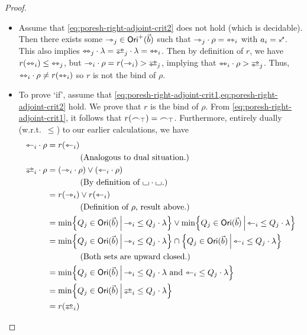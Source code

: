 \documentclass[a4paper]{memoir}
\begin{document}
\begin{proof}
\begin{enumerate}
\begin{itemize}
			\item Assume that \cref{eq:poresh-right-adjoint-crit2} does not hold (which is decidable).
			Then there exists some ${\rightarrowtriangle}_j \in {\mathsf{Ori}}^+(\vec b)$ such that ${\rightarrowtriangle}_j \cdot \rho = {\leftrightarrowtriangle}_i$ with $a_i = \ypolar$.
			This also implies $\equijetsym_j \cdot \lambda = \infrajetsym_j \cdot \lambda = \equijetsym_i$.
			Then by definition of $r$, we have $r({\leftrightarrowtriangle}_i) \leq {\leftrightarrowtriangle}_j$, but $\jetsym_i \cdot \rho = r(\jetsym_i) > \infrajetsym_j$, implying that $\equijetsym_i \cdot \rho > \infrajetsym_j$. Thus, ${\leftrightarrowtriangle}_i \cdot \rho \neq r({\leftrightarrowtriangle}_i)$ so $r$ is not the bind of $\rho$.
			
			\item To prove `if', assume that \cref{eq:poresh-right-adjoint-crit1,eq:poresh-right-adjoint-crit2} hold.
			We prove that $r$ is the bind of $\rho$.
			From \cref{eq:poresh-right-adjoint-crit1}, it follows that $r({\frown}_\top) = {\frown}_\top$.
			Furthermore, entirely dually (w.r.t.\ $\leq$) to our earlier calculations, we have
			\begin{align*}
				\tejsym_i \cdot \rho &= r(\tejsym_i) \\
				&\qquad \qquad \text{(Analogous to dual situation.)} \\
				\infrajetsym_i \cdot \rho
				&= (\jetsym_i \cdot \rho) \vee (\tejsym_i \cdot \rho) \\
				&\qquad \qquad \text{(By definition of $\loch \cdot \loch$.)} \\
				&= r(\jetsym_i) \vee r(\tejsym_i) \\
				&\qquad \qquad \text{(Definition of $\rho$, result above.)} \\
				&= \min \set{Q_j \in \orisymbol(\vec b)}{\jetsym_i \leq Q_j \cdot \lambda} \vee \min \set{Q_j \in \orisymbol(\vec b)}{\tejsym_i \leq Q_j \cdot \lambda} \\
				&= \min \set{Q_j \in \orisymbol(\vec b)}{\jetsym_i \leq Q_j \cdot \lambda} \cap \set{Q_j \in \orisymbol(\vec b)}{\tejsym_i \leq Q_j \cdot \lambda} \\
				&\qquad \qquad \text{(Both sets are upward closed.)} \\
				&= \min \set{Q_j \in \orisymbol(\vec b)}{\jetsym_i \leq Q_j \cdot \lambda \text{ and } \tejsym_i \leq Q_j \cdot \lambda} \\
				&= \min \set{Q_j \in \orisymbol(\vec b)}{\infrajetsym_i \leq Q_j \cdot \lambda} \\
				&= r(\infrajetsym_i) \\

\end{align*}
\end{itemize}
\end{enumerate}
\end{proof}
\end{document}
